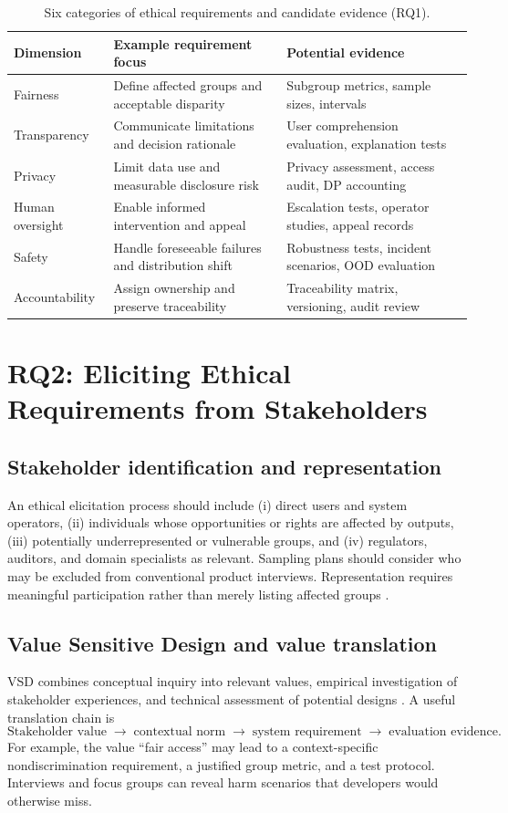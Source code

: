 \documentclass[11pt,a4paper]{article}
\begin{document}
\begin{table}[htbp]
\centering\small
\caption{Six categories of ethical requirements and candidate evidence (RQ1).}\label{tab:taxonomy}
\begin{tabularx}{\linewidth}{p{2.6cm}X X}
\toprule
\textbf{Dimension} & \textbf{Example requirement focus} & \textbf{Potential evidence}\\\midrule
Fairness & Define affected groups and acceptable disparity & Subgroup metrics, sample sizes, intervals\\
Transparency & Communicate limitations and decision rationale & User comprehension evaluation, explanation tests\\
Privacy & Limit data use and measurable disclosure risk & Privacy assessment, access audit, DP accounting\\
Human oversight & Enable informed intervention and appeal & Escalation tests, operator studies, appeal records\\
Safety & Handle foreseeable failures and distribution shift & Robustness tests, incident scenarios, OOD evaluation\\
Accountability & Assign ownership and preserve traceability & Traceability matrix, versioning, audit review\\
\bottomrule
\end{tabularx}
\end{table}

\section{RQ2: Eliciting Ethical Requirements from Stakeholders}
\subsection{Stakeholder identification and representation}
An ethical elicitation process should include (i) direct users and system operators, (ii) individuals whose opportunities or rights are affected by outputs, (iii) potentially underrepresented or vulnerable groups, and (iv) regulators, auditors, and domain specialists as relevant. Sampling plans should consider who may be excluded from conventional product interviews. Representation requires meaningful participation rather than merely listing affected groups \cite{friedman2013}.

\subsection{Value Sensitive Design and value translation}
VSD combines conceptual inquiry into relevant values, empirical investigation of stakeholder experiences, and technical assessment of potential designs \cite{friedman2013,umbrello2021}. A useful translation chain is
\[
\text{Stakeholder value}\;\longrightarrow\;\text{contextual norm}\;\longrightarrow\;\text{system requirement}\;\longrightarrow\;\text{evaluation evidence}.
\]
For example, the value ``fair access'' may lead to a context-specific nondiscrimination requirement, a justified group metric, and a test protocol. Interviews and focus groups can reveal harm scenarios that developers would otherwise miss.
\end{document}
